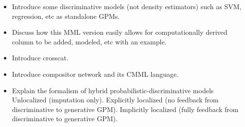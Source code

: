 \documentclass[10pt,letterpaper]{article}
\numberwithin{figure}{section}
\numberwithin{table}{section}
\begin{document}
\begin{itemize}
\item Introduce some discriminative models (not density estimators) such as SVM,
regression, etc as standalone GPMs.
\item Discuss how this MML version easily allows for computationally derived
column to be added, modeled, etc with an example.
\item Introduce crosscat.
\item Introduce compositor network and its CMML language.
\item Explain the formalism of hybrid probabilistic-discriminative models
    \subitem Unlocalized (imputation only).
    \subitem Explicitly localized (no feedback from discriminative to
        generative GPM).
    \subitem Implicitly localized (fully feedback from discriminative
        to generative GPM).
\end{itemize}



\end{document}
